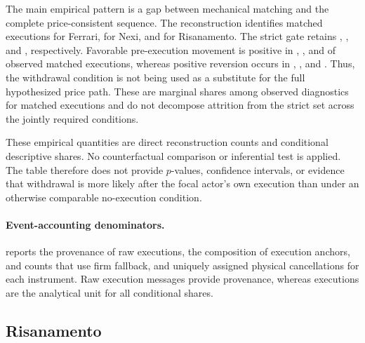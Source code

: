 \documentclass[11pt]{article}
\newenvironment{review}{\begingroup\color{blue}}{\endgroup}
\begin{document}
\FloatBarrier

The main empirical pattern is a gap between mechanical matching and the complete price-consistent sequence. The
reconstruction identifies \FerrariMatchedClusters{} matched executions for Ferrari, \NexiMatchedClusters{} for Nexi, and
\RisanamentoMatchedClusters{} for Risanamento. The strict gate retains \FerrariCompatibleSequences{},
\NexiCompatibleSequences{}, and \RisanamentoCompatibleSequences{}, respectively. Favorable pre-execution movement is
positive in \FerrariFPMShare{}, \NexiFPMShare{}, and \RisanamentoFPMShare{} of observed matched executions, whereas positive
reversion occurs in \FerrariREVShare{}, \NexiREVShare{}, and \RisanamentoREVShare{}. Thus, the withdrawal condition is not
being used as a substitute for the full hypothesized price path. These are marginal shares among \begin{review}observed diagnostics for matched executions\end{review} and do not decompose \begin{review}attrition from the strict set\end{review} across the jointly required conditions.

These empirical quantities are direct reconstruction counts and conditional descriptive shares. No counterfactual
comparison or inferential test is applied. The table therefore does not provide $p$-values, confidence intervals, or evidence
that withdrawal is more likely after the focal actor's own execution than under an otherwise comparable no-execution
condition.

\paragraph{Event-accounting denominators.}
 reports \begin{review}the provenance of raw executions, the composition of execution anchors, and counts that use firm fallback\end{review},
and uniquely assigned physical cancellations for each instrument. Raw execution messages provide provenance, whereas
executions are the analytical unit for all conditional shares.

\subsection{Risanamento}
\label{subsec:risanamento_results}
\end{document}
